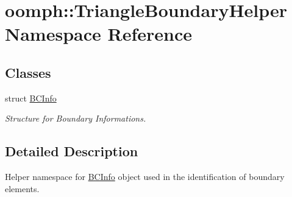 \hypertarget{namespaceoomph_1_1TriangleBoundaryHelper}{}\section{oomph\+:\+:Triangle\+Boundary\+Helper Namespace Reference}
\label{namespaceoomph_1_1TriangleBoundaryHelper}
\subsection*{Classes}
\begin{DoxyCompactItemize}
\item 
struct \hyperlink{structoomph_1_1TriangleBoundaryHelper_1_1BCInfo}{B\+C\+Info}
\begin{DoxyCompactList}\small\item\em Structure for Boundary Informations. \end{DoxyCompactList}\end{DoxyCompactItemize}


\subsection{Detailed Description}
Helper namespace for \hyperlink{structoomph_1_1TriangleBoundaryHelper_1_1BCInfo}{B\+C\+Info} object used in the identification of boundary elements. 